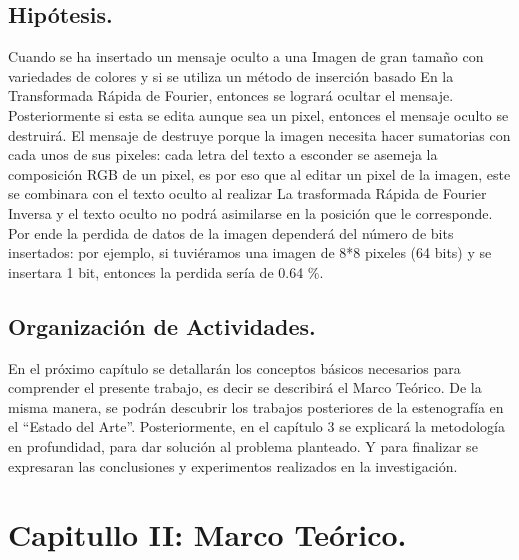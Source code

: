 \documentclass[12pt]{article}
\begin{document}
\subsection{Hipótesis.}
Cuando se ha insertado un mensaje oculto a una Imagen de gran tamaño con variedades de colores y si se utiliza un método de inserción basado En la Transformada Rápida de Fourier, entonces se logrará ocultar el mensaje. Posteriormente si esta se edita aunque sea un pixel, entonces el mensaje oculto se destruirá. El mensaje de destruye porque la imagen necesita hacer sumatorias con cada unos de sus pixeles: cada letra del texto a esconder se asemeja la composición RGB de un pixel, es por eso que al editar un pixel de la imagen, este se combinara con el texto oculto al realizar La trasformada Rápida de Fourier Inversa y el texto oculto no podrá asimilarse en la posición que le corresponde. Por ende la perdida de datos de la imagen dependerá del número de bits insertados: por ejemplo, si tuviéramos una imagen de 8*8 pixeles (64 bits) y se insertara 1 bit, entonces la perdida sería de 0.64 \%.

\subsection{Organización de Actividades.}
En el próximo capítulo se detallarán los conceptos básicos necesarios para comprender  el presente trabajo, es decir se describirá el Marco Teórico. De la misma manera, se podrán descubrir los trabajos posteriores  de la estenografía en el “Estado del Arte”. Posteriormente, en el capítulo 3 se explicará la metodología en profundidad, para dar solución al problema planteado. Y para finalizar se expresaran las conclusiones y experimentos realizados en la investigación.

\newpage
\section{Capitullo II: Marco Teórico.}
\end{document}
